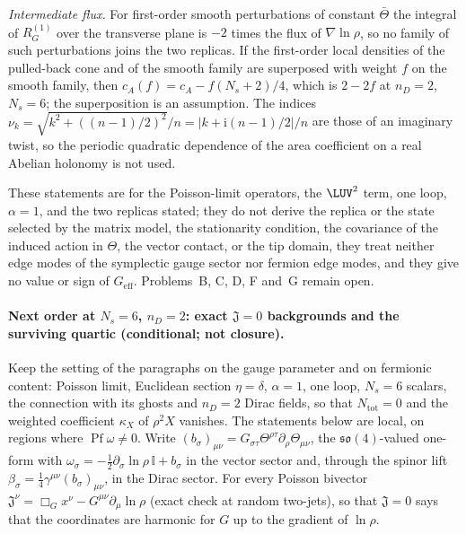\emph{Intermediate flux.} For first-order smooth perturbations of constant \(\bar\Theta\) the integral of \(R_G^{(1)}\) over the transverse plane is \(-2\) times the flux of \(\nabla\ln\rho\), so no family of such perturbations joins the two replicas. If the first-order local densities of the pulled-back cone and of the smooth family are superposed with weight \(f\) on the smooth family, then \(c_A(f)=c_A-f(N_s+2)/4\), which is \(2-2f\) at \(n_D=2\), \(N_s=6\); the superposition is an assumption. The indices \(\nu_k=\sqrt{k^2+((n-1)/2)^2}/n=|k+\mathrm i(n-1)/2|/n\) are those of an imaginary twist, so the periodic quadratic dependence of the area coefficient on a real Abelian holonomy is not used.

These statements are for the Poisson-limit operators, the \(\LUV^2\) term, one loop, \(\alpha=1\), and the two replicas stated; they do not derive the replica or the state selected by the matrix model, the stationarity condition, the covariance of the induced action in \(\Theta\), the vector contact, or the tip domain, they treat neither edge modes of the symplectic gauge sector nor fermion edge modes, and they give no value or sign of \(G_{\mathrm{eff}}\). Problems~B, C, D, F and~G remain open.

\paragraph{Next order at \(N_s=6\), \(n_D=2\): exact \(\mathfrak J=0\) backgrounds and the surviving quartic (conditional; not closure).}
Keep the setting of the paragraphs on the gauge parameter and on fermionic content: Poisson limit, Euclidean section \(\eta=\delta\), \(\alpha=1\), one loop, \(N_s=6\) scalars, the connection with its ghosts and \(n_D=2\) Dirac fields, so that \(N_{\mathrm{tot}}=0\) and the weighted coefficient \(\kappa_X\) of \(\rho^2X\) vanishes. The statements below are local, on regions where \(\operatorname{Pf}\omega\ne0\). Write \((b_\sigma)_{\mu\nu}=G_{\sigma\tau}\Theta^{\rho\tau}\partial_\rho\Theta_{\mu\nu}\), the \(\mathfrak{so}(4)\)-valued one-form with \(\omega_\sigma=-\tfrac12\partial_\sigma\ln\rho\,\mathbb I+b_\sigma\) in the vector sector and, through the spinor lift \(\beta_\sigma=\tfrac14\gamma^{\mu\nu}(b_\sigma)_{\mu\nu}\), in the Dirac sector. For every Poisson bivector \(\mathfrak J^\nu=\Box_Gx^\nu-G^{\mu\nu}\partial_\mu\ln\rho\) (exact check at random two-jets), so that \(\mathfrak J=0\) says that the coordinates are harmonic for \(G\) up to the gradient of \(\ln\rho\).

